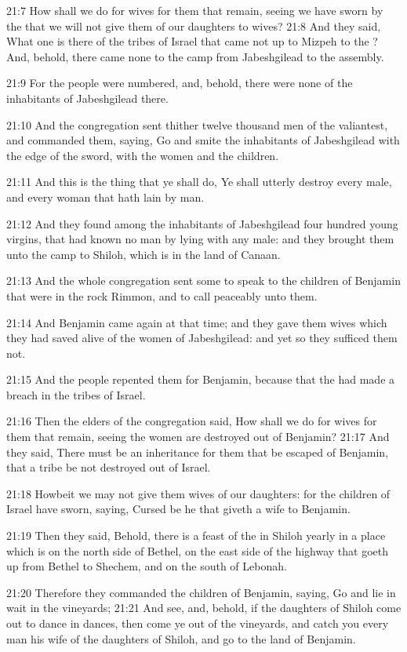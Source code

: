 21:7 How shall we do for wives for them that remain, seeing we have
sworn by the \LORD that we will not give them of our daughters to
wives?  21:8 And they said, What one is there of the tribes of Israel
that came not up to Mizpeh to the \LORD? And, behold, there came none
to the camp from Jabeshgilead to the assembly.

21:9 For the people were numbered, and, behold, there were none of the
inhabitants of Jabeshgilead there.

21:10 And the congregation sent thither twelve thousand men of the
valiantest, and commanded them, saying, Go and smite the inhabitants
of Jabeshgilead with the edge of the sword, with the women and the
children.

21:11 And this is the thing that ye shall do, Ye shall utterly destroy
every male, and every woman that hath lain by man.

21:12 And they found among the inhabitants of Jabeshgilead four
hundred young virgins, that had known no man by lying with any male:
and they brought them unto the camp to Shiloh, which is in the land of
Canaan.

21:13 And the whole congregation sent some to speak to the children of
Benjamin that were in the rock Rimmon, and to call peaceably unto
them.

21:14 And Benjamin came again at that time; and they gave them wives
which they had saved alive of the women of Jabeshgilead: and yet so
they sufficed them not.

21:15 And the people repented them for Benjamin, because that the \LORD
had made a breach in the tribes of Israel.

21:16 Then the elders of the congregation said, How shall we do for
wives for them that remain, seeing the women are destroyed out of
Benjamin?  21:17 And they said, There must be an inheritance for them
that be escaped of Benjamin, that a tribe be not destroyed out of
Israel.

21:18 Howbeit we may not give them wives of our daughters: for the
children of Israel have sworn, saying, Cursed be he that giveth a wife
to Benjamin.

21:19 Then they said, Behold, there is a feast of the \LORD in Shiloh
yearly in a place which is on the north side of Bethel, on the east
side of the highway that goeth up from Bethel to Shechem, and on the
south of Lebonah.

21:20 Therefore they commanded the children of Benjamin, saying, Go
and lie in wait in the vineyards; 21:21 And see, and, behold, if the
daughters of Shiloh come out to dance in dances, then come ye out of
the vineyards, and catch you every man his wife of the daughters of
Shiloh, and go to the land of Benjamin.


